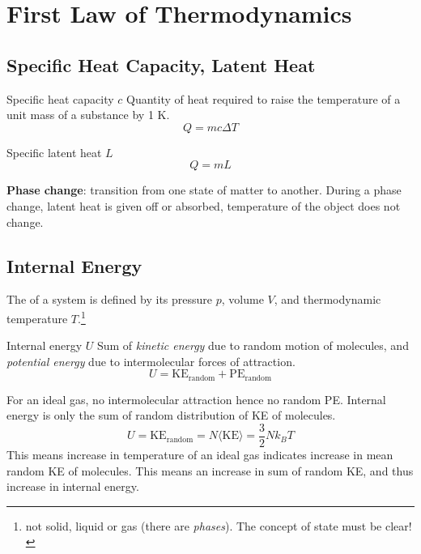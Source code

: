 \section{First Law of Thermodynamics}
\subsection{Specific Heat Capacity, Latent Heat}
\begin{defn}{Specific heat capacity $c$}{}
Quantity of heat required to raise the temperature of a unit mass of a substance by 1 \unit{K}.
\begin{equation}
Q = mc\Delta T
\end{equation}
\end{defn}

\begin{defn}{Specific latent heat $L$}{}
\begin{equation}
Q = mL
\end{equation}
\end{defn}

\textbf{Phase change}: transition from one state of matter to another. During a phase change, latent heat is given off or absorbed, temperature of the object does not change.

\subsection{Internal Energy}
The  of a system is defined by its pressure $p$, volume $V$, and thermodynamic temperature $T$.\footnote{not solid, liquid or gas (there are \emph{phases}). The concept of state must be clear!}

\begin{defn}{Internal energy $U$}{}
Sum of \emph{kinetic energy} due to random motion of molecules, and \emph{potential energy} due to intermolecular forces of attraction.
\begin{equation}
U = \text{KE}_\text{random} + \text{PE}_\text{random}
\end{equation}
\end{defn}

For an ideal gas, no intermolecular attraction hence no random PE. Internal energy is only the sum of random distribution of KE of molecules.
\[ U = \text{KE}_\text{random} = N\langle\text{KE}\rangle = \frac{3}{2}Nk_BT \]
This means increase in temperature of an ideal gas indicates increase in mean random KE of molecules. This means an increase in sum of random KE, and thus increase in internal energy.

